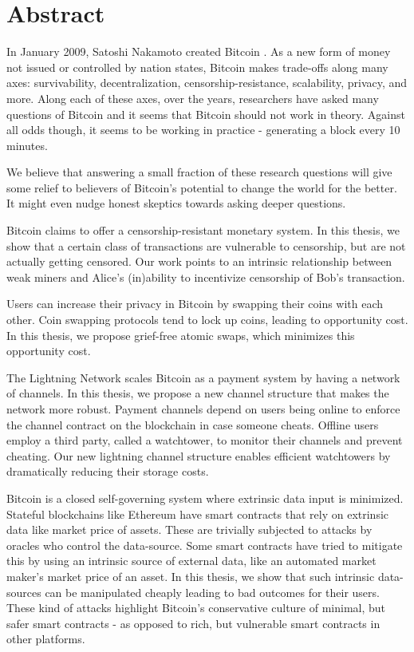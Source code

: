 
\chapter*{Abstract}

In January 2009, Satoshi Nakamoto created Bitcoin \cite{bitcoin_whitepaper}. As a new form of money not issued or controlled by nation states, Bitcoin makes trade-offs along many axes: survivability, decentralization, censorship-resistance, scalability, privacy, and more. Along each of these axes, over the years, researchers have asked many questions of Bitcoin and it seems that Bitcoin should not work in theory. Against all odds though, it seems to be working in practice - generating a block every 10 minutes.

We believe that answering a small fraction of these research questions will give some relief to believers of Bitcoin's potential to change the world for the better. It might even nudge honest skeptics towards asking deeper questions.

Bitcoin claims to offer a censorship-resistant monetary system. In this thesis, we show that a certain class of transactions are vulnerable to censorship, but are not actually getting censored. Our work points to an intrinsic relationship between weak miners and Alice's (in)ability to incentivize censorship of Bob's transaction.

Users can increase their privacy in Bitcoin by swapping their coins with each other. Coin swapping protocols tend to lock up coins, leading to opportunity cost. In this thesis, we propose grief-free atomic swaps, which minimizes this opportunity cost. 

The Lightning Network scales Bitcoin as a payment system by having a network of channels. In this thesis, we propose a new channel structure that makes the network more robust. Payment channels depend on users being online to enforce the channel contract on the blockchain in case someone cheats. Offline users employ a third party, called a watchtower, to monitor their channels and prevent cheating. Our new lightning channel structure enables efficient watchtowers by dramatically reducing their storage costs. 

Bitcoin is a closed self-governing system where extrinsic data input is minimized. Stateful blockchains like Ethereum have smart contracts that rely on extrinsic data like market price of assets. These are trivially subjected to attacks by oracles who control the data-source. Some smart contracts have tried to mitigate this by using an intrinsic source of external data, like an automated market maker's market price of an asset. In this thesis, we show that such intrinsic data-sources can be manipulated cheaply leading to bad outcomes for their users. These kind of attacks highlight Bitcoin's conservative culture of minimal, but safer smart contracts - as opposed to rich, but vulnerable smart contracts in other platforms.